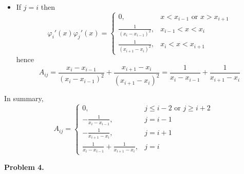 \documentclass{article}
\def\tbf#1{\textbf{#1}}
\newcommand{\vp}{\varphi}
\begin{document}
\begin{enumerate}[label=(\alph*)]
\begin{itemize}
	\item If $j=i$ then
	$$\vp_i'(x)\vp_j'(x) =
	\begin{cases}
		0, & x< x_{i-1} \text{ or } x> x_{i+1}\\
		\frac{1}{(x_i-x_{i-1})^2}, & x_{i-1}<x<x_i\\
		\frac{1}{(x_{i+1}-x_i)^2}, & x_i<x<x_{i+1}
	\end{cases}$$
	hence
	$$A_{ij} = \frac{x_i-x_{i-1}}{(x_i-x_{i-1})^2} + \frac{x_{i+1}-x_i}{(x_{i+1}-x_i)^2}
	= \frac{1}{x_i-x_{i-1}} + \frac{1}{x_{i+1}-x_i}$$
	
\end{itemize}
In summary,
$$A_{ij} = 
\begin{cases}
	0, & j\le i-2 \text{ or } j\ge i+2\\
	-\frac{1}{x_i-x_{i-1}}, & j=i-1\\
	-\frac{1}{x_{i+1}-x_{i}}, & j=i+1\\
	\frac{1}{x_i-x_{i-1}} + \frac{1}{x_{i+1}-x_i}, & j=i
\end{cases}$$

\end{enumerate}


\tbf{Problem 4.}
\end{document}
